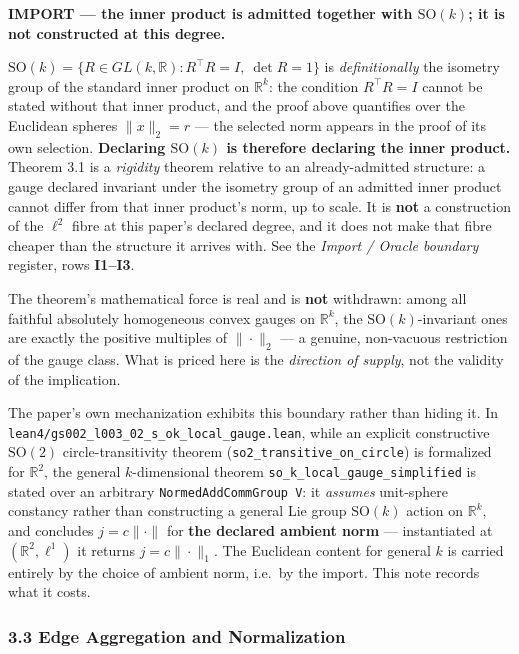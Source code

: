 \documentclass[
  11pt,
]{article}
\renewenvironment{quote}
  {\begin{leftbar}\small}
  {\end{leftbar}}
\begin{document}
\begin{quote}
\textbf{IMPORT --- the inner product is admitted together with
\(\mathrm{SO}(k)\); it is not constructed at this degree.}

\(\mathrm{SO}(k)=\{R\in GL(k,\mathbb R): R^\top R=I,\ \det R=1\}\) is
\emph{definitionally} the isometry group of the standard inner product
on \(\mathbb R^k\): the condition \(R^\top R=I\) cannot be stated
without that inner product, and the proof above quantifies over the
Euclidean spheres \(\|x\|_2=r\) --- the selected norm appears in the
proof of its own selection. \textbf{Declaring \(\mathrm{SO}(k)\) is
therefore declaring the inner product.} Theorem 3.1 is a \emph{rigidity}
theorem relative to an already-admitted structure: a gauge declared
invariant under the isometry group of an admitted inner product cannot
differ from that inner product's norm, up to scale. It is \textbf{not} a
construction of the \(\ell^2\) fibre at this paper's declared degree,
and it does not make that fibre cheaper than the structure it arrives
with. See the \emph{Import / Oracle boundary} register, rows
\textbf{I1--I3}.

The theorem's mathematical force is real and is \textbf{not} withdrawn:
among all faithful absolutely homogeneous convex gauges on
\(\mathbb R^k\), the \(\mathrm{SO}(k)\)-invariant ones are exactly the
positive multiples of \(\|\cdot\|_2\) --- a genuine, non-vacuous
restriction of the gauge class. What is priced here is the
\emph{direction of supply}, not the validity of the implication.

The paper's own mechanization exhibits this boundary rather than hiding
it. In \texttt{lean4/gs002\_l003\_02\_s\_ok\_local\_gauge.lean}, while
an explicit constructive \(\mathrm{SO}(2)\) circle-transitivity theorem
(\texttt{so2\_transitive\_on\_circle}) is formalized for
\(\mathbb{R}^2\), the general \(k\)-dimensional theorem
\texttt{so\_k\_local\_gauge\_simplified} is stated over an arbitrary
\texttt{NormedAddCommGroup\ V}: it \emph{assumes} unit-sphere constancy
rather than constructing a general Lie group \(\mathrm{SO}(k)\) action
on \(\mathbb{R}^k\), and concludes \(j=c\|\cdot\|\) for \textbf{the
declared ambient norm} --- instantiated at \((\mathbb R^2,\ell^1)\) it
returns \(j=c\|\cdot\|_1\). The Euclidean content for general \(k\) is
carried entirely by the choice of ambient norm, i.e.~by the import. This
note records what it costs.

\subsubsection{3.3 Edge Aggregation and
Normalization}\label{edge-aggregation-and-normalization}
\end{quote}
\end{document}
